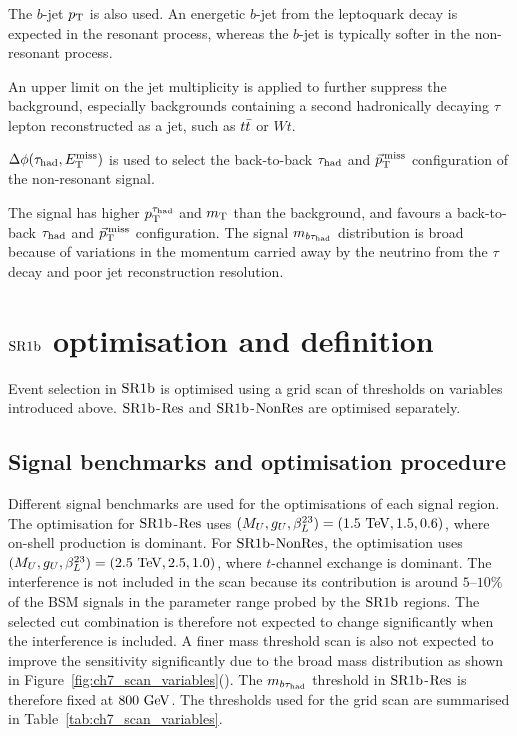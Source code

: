 The $b$-jet $p_{\mathrm{T}}$ is also used. An energetic $b$-jet from the leptoquark decay is expected in the resonant process, whereas the $b$-jet is typically softer in the non-resonant process. 

An upper limit on the jet multiplicity is applied to further suppress the background, especially backgrounds containing a second hadronically decaying $\tau$ lepton reconstructed as a jet, such as $t\bar{t}$ or $Wt$.

$\Delta\phi(\tau_{\mathrm{had}}, E_{\mathrm{T}}^{\mathrm{miss}})$ is used to select the back-to-back $\tau_{\mathrm{had}}$ and $\vec p_{\mathrm{T}}^{\,\mathrm{miss}}$ configuration of the non-resonant signal.

The signal has higher $p_{\mathrm{T}}^{\tau_{\mathrm{had}}}$ and $m_{\mathrm{T}}$ than the background, and favours a back-to-back $\tau_{\mathrm{had}}$ and $\vec p_{\mathrm{T}}^{\,\mathrm{miss}}$ configuration.
The signal $m_{b\tau_{\mathrm{had}}}$ distribution is broad because of variations in the momentum carried away by the neutrino from the $\tau$ decay and poor jet reconstruction resolution.





\section[$\bTagSR$ optimisation and definition]{$\bTagSR$ optimisation and definition}
\label{sec:ch7_sr1b}

Event selection in $\bTagSR$ is optimised using a grid scan of thresholds on variables introduced above. $\bTagSR$-$\mathrm{Res}$ and $\bTagSR$-$\mathrm{NonRes}$ are optimised separately.

\subsection{Signal benchmarks and optimisation procedure}
\label{subsec:ch7_scan}

Different signal benchmarks are used for the optimisations of each signal region. The optimisation for $\bTagSR$-$\mathrm{Res}$ uses $(M_U,g_U,\beta_L^{23})=(1.5~\mathrm{TeV},1.5,0.6)$, where on-shell production is dominant.
For $\bTagSR$-$\mathrm{NonRes}$, the optimisation uses $(M_U,g_U,\beta_L^{23})=(2.5~\mathrm{TeV},2.5,1.0)$, where $t$-channel exchange is dominant.
The interference is not included in the scan because its contribution is around $5$--$10\%$ of the BSM signals in the parameter range probed by the $\bTagSR$ regions.
The selected cut combination is therefore not expected to change significantly when the interference is included.
A finer mass threshold scan is also not expected to improve the sensitivity significantly due to the broad mass distribution as shown in Figure~\ref{fig:ch7_scan_variables}(). The $m_{b\tau_{\mathrm{had}}}$ threshold in $\bTagSR$-$\mathrm{Res}$ is therefore fixed at $800~\mathrm{GeV}$.
The thresholds used for the grid scan are summarised in Table~\ref{tab:ch7_scan_variables}.

